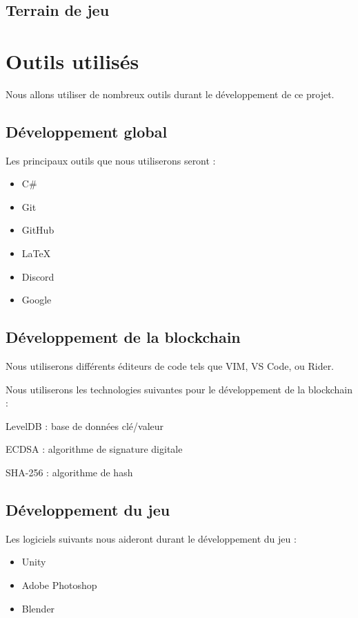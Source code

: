\documentclass{article}
\begin{document}
\subsection{Terrain de jeu}





\section{Outils utilisés}
Nous allons utiliser de nombreux outils durant le développement de ce projet.

\subsection{Développement global}
Les principaux outils que nous utiliserons seront :

\begin{itemize}
    \item C\#
    \item Git
    \item GitHub
    \item \LaTeX
    \item Discord
    \item Google

\end{itemize}

\subsection{Développement de la blockchain}
Nous utiliserons différents éditeurs de code tels que VIM, VS Code, ou Rider.

Nous utiliserons les technologies suivantes pour le développement de la blockchain :
\begin{itemize}
\begin{samepage}
    \item LevelDB : base de données clé/valeur
    \item ECDSA : algorithme de signature digitale
    \item SHA-256 : algorithme de hash
\end{samepage}
\end{itemize}

\subsection{Développement du jeu}

Les logiciels suivants nous aideront durant le développement du jeu :
\begin{itemize}
    \item Unity
    \item Adobe Photoshop
    \item Blender
\end{itemize}
\end{document}
